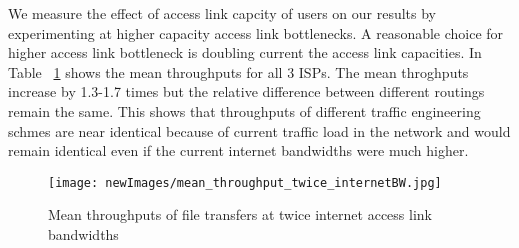 We measure the effect of access link capcity of users on our results by experimenting at higher capacity access link bottlenecks. A reasonable choice for higher access link bottleneck is doubling current the access link capacities. In Table ~\ref{fig:all_isps_internetBWx2} shows the mean throughputs for all 3 ISPs. The mean throghputs increase by 1.3-1.7 times but the relative difference between different routings remain the same. This shows that throughputs of different traffic engineering schmes are near identical because of current traffic load in the network and would remain identical even if the current internet bandwidths were much higher.

\begin{figure}[tbh]
  \begin{center}
\texttt{[image: newImages/mean\_throughput\_twice\_internetBW.jpg]}
  \end{center}
  \caption{Mean throughputs of file transfers at twice internet access link bandwidths}
  \label{fig:all_isps_internetBWx2}
\end{figure}


